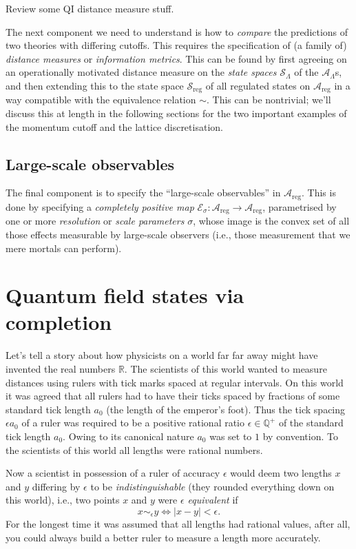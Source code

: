 \documentclass[11pt]{amsart}
\theoremstyle{plain}%
\theoremstyle{definition}
\theoremstyle{remark}
\begin{document}
Review some QI distance measure stuff.


The next component we need to understand is how to \emph{compare} the predictions of two theories with differing cutoffs. This requires the specification of (a family of) \emph{distance measures} or \emph{information metrics}. This can be found by first agreeing on an operationally motivated distance measure on the \emph{state spaces} $\mathcal{S}_\Lambda$ of the $\mathcal{A}_\Lambda$s, and then extending this to the state space $\mathcal{S}_{\text{reg}}$ of all regulated states on $\mathcal{A}_{\text{reg}}$ in a way compatible with the equivalence relation $\sim$. This can be nontrivial; we'll discuss this at length in the following sections for the two important examples of the momentum cutoff and the lattice discretisation.


\subsection{Large-scale observables}


The final component is to specify the ``large-scale observables'' in $\mathcal{A}_{\text{reg}}$. This is done by specifying a \emph{completely positive map} $\mathcal{E}_\sigma : \mathcal{A}_{\text{reg}} \rightarrow \mathcal{A}_{\text{reg}}$, parametrised by one or more \emph{resolution} or \emph{scale parameters} $\sigma$, whose image is the convex set of all those effects measurable by large-scale observers (i.e., those measurement that we mere mortals can perform). 

\section{Quantum field states via completion}\label{sec:qftcompletion}
Let's tell a story about how physicists on a world far far away might have invented the real numbers $\mathbb{R}$.  The scientists of this world wanted to measure distances using rulers with tick marks spaced at regular intervals. On this world it was agreed that all rulers had to have their ticks spaced by fractions of some standard tick length $a_0$ (the length of the emperor's foot). Thus the tick spacing $\epsilon a_0$ of a ruler was required to be a positive rational ratio $\epsilon \in \mathbb{Q}^+$ of the standard tick length $a_0$. Owing to its canonical nature $a_0$ was set to $1$ by convention. To the scientists of this world all lengths were rational numbers. 

Now a scientist in possession of a ruler of accuracy $\epsilon$ would deem two lengths $x$ and $y$ differing by $\epsilon$ to be \emph{indistinguishable} (they rounded everything down on this world), i.e., two points $x$ and $y$ were \emph{$\epsilon$ equivalent} if
\begin{equation}
	x\sim_\epsilon y \Leftrightarrow |x-y| < \epsilon. 
\end{equation} 
For the longest time it was assumed that all lengths had rational values, after all, you could always build a better ruler to measure a length more accurately. 
\end{document}
